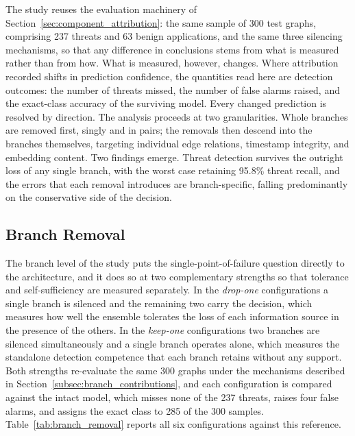 \documentclass[%
    BCOR=10mm,
    DIV=13,
    toc=bibliography,
    toc=listof,
    oneside,
    12pt,
]{scrbook}
\begin{document}
The study reuses the evaluation machinery of
Section~\ref{sec:component_attribution}: the same sample of 300 test graphs,
comprising 237 threats and 63 benign applications, and the same three
silencing mechanisms, so that any difference in conclusions stems from what is
measured rather than from how. What is measured, however, changes. Where
attribution recorded shifts in prediction confidence, the quantities read
here are detection outcomes: the number of threats missed, the number of
false alarms raised, and the exact-class accuracy of the surviving model.
Every changed prediction is resolved by direction. The analysis proceeds at
two granularities. Whole branches are removed first, singly and in pairs; the
removals then descend into the branches themselves, targeting individual edge
relations, timestamp integrity, and embedding content. Two findings emerge.
Threat
detection survives the outright loss of any single branch, with the worst
case retaining 95.8\% threat recall, and the errors that each removal
introduces are branch-specific, falling predominantly on the conservative
side of the decision.

\subsection{Branch Removal}
\label{subsec:branch_removal}

The branch level of the study puts the single-point-of-failure question
directly to the architecture, and it does so at two complementary strengths
so that tolerance and self-sufficiency are measured separately. In the
\emph{drop-one} configurations a single branch is silenced and the remaining
two carry the decision, which measures how well the ensemble tolerates the
loss of each information source in the presence of the others. In the
\emph{keep-one} configurations two branches are silenced simultaneously and a
single branch operates alone, which measures the standalone detection
competence that each branch retains without any support. Both strengths
re-evaluate the same 300 graphs under the mechanisms described in
Section~\ref{subsec:branch_contributions}, and each configuration is compared
against the intact model, which misses none of the 237 threats, raises four
false alarms, and assigns the exact class to 285 of the 300 samples.
Table~\ref{tab:branch_removal} reports all six configurations against this
reference.
\end{document}
